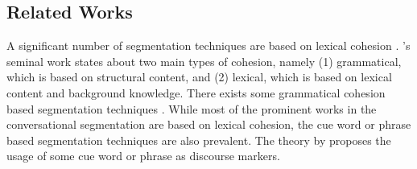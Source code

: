 \documentclass{article}
\begin{document}
\subsection{Related Works}\label{sec:relwrk}

A significant number of segmentation techniques are based on lexical cohesion \cite{hearst-97,elhadad-99,utiyama-01,galley-03,malioutov-06,eisenstein-08}. %
\cite{halliday-76}'s seminal work states about two main types of cohesion, namely (1) grammatical, which is based on structural content, and (2) lexical, which is based on lexical content and background knowledge. There exists some grammatical cohesion based segmentation techniques \cite{giora1983,bestgen2000,taboada-09}. %
%
While most of the prominent works in the conversational segmentation are based on lexical cohesion, the cue word or phrase based segmentation techniques are also prevalent. The theory by \cite{grosz-77} proposes the usage of some cue word or phrase as discourse markers. %
\end{document}
